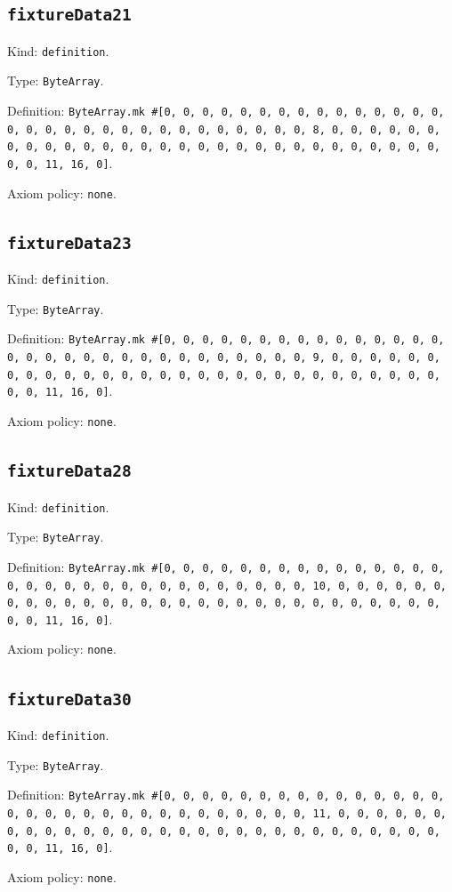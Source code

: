 \documentclass[11pt]{article}
\begin{document}
\subsection*{\texttt{fixtureData21}}
\noindent Kind: \texttt{definition}.\par
\noindent Type: \texttt{ByteArray}.\par
\noindent Definition: \texttt{ByteArray.mk \#[0, 0, 0, 0, 0, 0, 0, 0, 0, 0, 0, 0, 0, 0, 0, 0, 0, 0, 0, 0, 0, 0, 0, 0, 0, 0, 0, 0, 0, 0, 0, 8, 0, 0, 0, 0, 0, 0, 0, 0, 0, 0, 0, 0, 0, 0, 0, 0, 0, 0, 0, 0, 0, 0, 0, 0, 0, 0, 0, 0, 0, 0, 0, 11, 16, 0]}.\par
\noindent Axiom policy: \texttt{none}.\par
\subsection*{\texttt{fixtureData23}}
\noindent Kind: \texttt{definition}.\par
\noindent Type: \texttt{ByteArray}.\par
\noindent Definition: \texttt{ByteArray.mk \#[0, 0, 0, 0, 0, 0, 0, 0, 0, 0, 0, 0, 0, 0, 0, 0, 0, 0, 0, 0, 0, 0, 0, 0, 0, 0, 0, 0, 0, 0, 0, 9, 0, 0, 0, 0, 0, 0, 0, 0, 0, 0, 0, 0, 0, 0, 0, 0, 0, 0, 0, 0, 0, 0, 0, 0, 0, 0, 0, 0, 0, 0, 0, 11, 16, 0]}.\par
\noindent Axiom policy: \texttt{none}.\par
\subsection*{\texttt{fixtureData28}}
\noindent Kind: \texttt{definition}.\par
\noindent Type: \texttt{ByteArray}.\par
\noindent Definition: \texttt{ByteArray.mk \#[0, 0, 0, 0, 0, 0, 0, 0, 0, 0, 0, 0, 0, 0, 0, 0, 0, 0, 0, 0, 0, 0, 0, 0, 0, 0, 0, 0, 0, 0, 0, 10, 0, 0, 0, 0, 0, 0, 0, 0, 0, 0, 0, 0, 0, 0, 0, 0, 0, 0, 0, 0, 0, 0, 0, 0, 0, 0, 0, 0, 0, 0, 0, 11, 16, 0]}.\par
\noindent Axiom policy: \texttt{none}.\par
\subsection*{\texttt{fixtureData30}}
\noindent Kind: \texttt{definition}.\par
\noindent Type: \texttt{ByteArray}.\par
\noindent Definition: \texttt{ByteArray.mk \#[0, 0, 0, 0, 0, 0, 0, 0, 0, 0, 0, 0, 0, 0, 0, 0, 0, 0, 0, 0, 0, 0, 0, 0, 0, 0, 0, 0, 0, 0, 0, 11, 0, 0, 0, 0, 0, 0, 0, 0, 0, 0, 0, 0, 0, 0, 0, 0, 0, 0, 0, 0, 0, 0, 0, 0, 0, 0, 0, 0, 0, 0, 0, 11, 16, 0]}.\par
\noindent Axiom policy: \texttt{none}.\par
\end{document}
